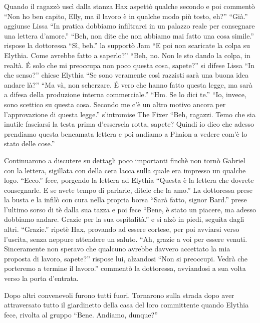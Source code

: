     Quando il ragazzò uscì dalla stanza Hax aspettò qualche secondo e poi
    commentò ``Non ho ben capito, Elly, ma il lavoro è in qualche modo più
    tosto, eh?'' ``Già.'' aggiunse Lissa ``In pratica dobbiamo infiltrarci
    in un palazzo reale per consegnare una lettera d'amore.'' ``Beh, non
    dite che non abbiamo mai fatto una cosa simile.'' rispose la dottoressa
    ``Sì, beh.'' la supportò Jam ``E poi non scaricate la colpa su Elythia.
    Come avrebbe fatto a saperlo?'' ``Beh, no. Non le sto dando la colpa,
    in realtà. \'E solo che mi preoccupa non poco questa cosa, sapete?'' si
    difese Lissa ``In che senso?'' chiese Elythia ``Se sono veramente così
    razzisti sarà una buona idea andare là?'' ``Ma và, non scherzare. \'E
    vero che hanno fatto questa legge, ma sarà a difesa della produzione
    interna commerciale.'' ``Hm. Se lo dici te.'' ``Io, invece, sono
    scettico su questa cosa. Secondo me c'è un altro motivo ancora per
    l'approvazione di questa legge.'' s'intromise The Fixer ``Beh, ragazzi.
    Temo che sia inutile fasciarsi la testa prima d'essersela rotta,
    sapete? Quindi io dico che adesso prendiamo questa beneamata lettera e
    poi andiamo a Phaion a vedere com'è lo stato delle cose.''

    Continuarono a discutere su dettagli poco importanti finchè non tornò
    Gabriel con la lettera, sigillata con della cera lacca sulla quale era
    impresso un qualche logo. ``Ecco.'' fece, porgendo la lettera ad
    Elythia ``Questa è la lettera che dovrete consegnarle. E se avete
    tempo di parlarle, ditele che la amo.'' La dottoressa prese la busta e
    la infilò con cura nella propria borsa ``Sarà fatto, signor Bard.''
    prese l'ultimo sorso di tè dalla sua tazza e poi fece ``Bene, è stato
    un piacere, ma adesso dobbiamo andare. Grazie per la sua ospitalità.''
    e si alzò in piedi, seguita dagli altri. ``Grazie.'' ripetè Hax,
    provando ad essere cortese, per poi avviarsi verso l'uscita, senza
    neppure attendere un saluto. ``Ah, grazie a voi per essere venuti.
    Sinceramente non speravo che qualcuno avrebbe davvero accettato la mia
    proposta di lavoro, sapete?'' rispose lui, alzandosi ``Non si
    preoccupi. Vedrà che porteremo a termine il lavoro.'' commentò la
    dottoressa, avviandosi a sua volta verso la porta d'entrata.

    Dopo altri convenevoli furono tutti fuori. Tornarono sulla strada dopo
    aver attraversato tutto il giardinetto della casa del loro committente
    quando Elythia fece, rivolta al gruppo ``Bene. Andiamo, dunque?''

